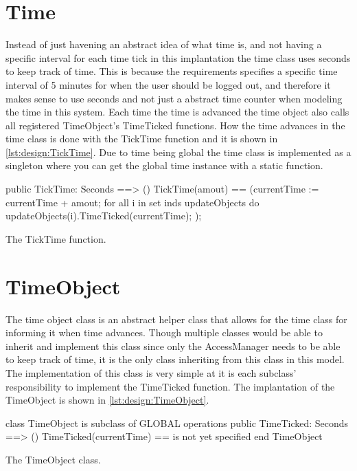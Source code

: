 \section{Time}
Instead of just havening an abstract idea of what time is, and not having a specific interval for each time tick in this implantation the time class uses seconds to keep track of time. This is because the requirements specifies a specific time interval of 5 minutes for when the user should be logged out, and therefore it makes sense to use seconds and not just a abstract time counter when modeling the time in this system. Each time the time is advanced the time object also calls all registered {\ttfamily TimeObject}'s {\ttfamily TimeTicked} functions. How the time advances in the time class is done with the {\ttfamily TickTime} function and it is shown in \cref{lst:design:TickTime}. Due to time being global the time class is implemented as a singleton where you can get the global time instance with a static function.

\begin{listing}[H]
    \begin{vdm_al}
public TickTime: Seconds ==> ()
        TickTime(amout) == (currentTime := currentTime + amout;
            for all i in set inds updateObjects do
                updateObjects(i).TimeTicked(currentTime);
        );
    

    \end{vdm_al}
    \caption{The {\ttfamily TickTime} function.}
    \label{lst:design:TickTime}
\end{listing}
\section{TimeObject}
The time object class is an abstract helper class that allows for the time class for informing it when time advances. Though multiple classes would be able to inherit and implement this class since only the {\ttfamily AccessManager} needs to be able to keep track of time, it is the only class inheriting from this class in this model. The implementation of this class is very simple at it is each subclass' responsibility to implement the {\ttfamily TimeTicked} function. The implantation of the {\ttfamily TimeObject} is shown in \cref{lst:design:TimeObject}.

\begin{listing}[H]
    \begin{vdm_al}
class TimeObject is subclass of GLOBAL
operations
    public TimeTicked: Seconds ==> ()
    TimeTicked(currentTime) == 
        is not yet specified
end TimeObject

    \end{vdm_al}
    \caption{The {\ttfamily TimeObject} class.}
    \label{lst:design:TimeObject}
\end{listing}
